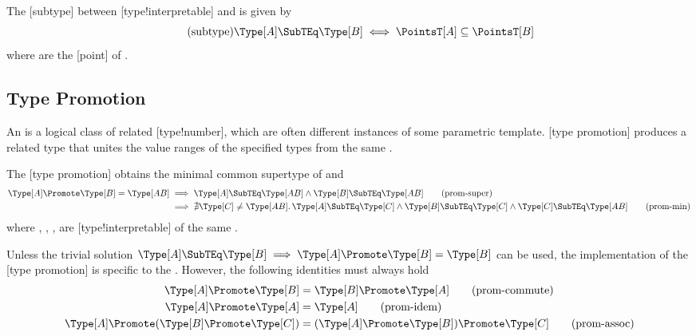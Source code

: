 \begin{definition}
    The [subtype] between [type!interpretable] \Type[A] and \Type[B] is given by
    \begin{equation*}
        \label{eq:subtype}
        \tag{subtype}
        \Type[A] \SubTEq \Type[B] \iff \PointsT[A] \subseteq \PointsT[B]
    \end{equation*}
    where \PointsT{} are the [point] of  \Type[T].
\end{definition}

\subsection{Type Promotion}

An  is a logical class of related [type!number], which are often different instances of some parametric  template.
[type promotion] produces a related type that unites the value ranges of the specified types from the same .

\begin{definition}
    The [type promotion] \Promote{} obtains the minimal common supertype of \Type[A] and \Type[B]
    \begin{align*}
        \Type[A] \Promote \Type[B] = \Type[AB] &\implies \Type[A] \SubTEq \Type[AB] \land \Type[B] \SubTEq \Type[AB] \tag{prom-super}\label{eq:prom_super}\\
        &\implies \nexists \Type[C] \ne \Type[AB]\ldotp\Type[A] \SubTEq \Type[C] \land \Type[B] \SubTEq \Type[C] \land \Type[C]\SubTEq\Type[AB] \tag{prom-min}\label{eq:prom_min}
    \end{align*}
    where \Type[A], \Type[B], \Type[AB], \Type[C] are [type!interpretable] of the same .
\end{definition}

Unless the trivial solution \(\Type[A] \SubTEq \Type[B] \implies \Type[A] \Promote \Type[B] = \Type[B]\) can be used, the implementation of the [type promotion] is specific to the .
However, the following identities must always hold
\begin{align*}
    \Type[A] \Promote \Type[B] &= \Type[B] \Promote \Type[A] \tag{prom-commute}\label{eq:prom_commute}\\
    \Type[A] \Promote \Type[A] &= \Type[A] \tag{prom-idem}\label{eq:prom_idem}\\
    \Type[A] \Promote (\Type[B] \Promote \Type[C]) &= (\Type[A] \Promote \Type[B]) \Promote \Type[C] \tag{prom-assoc}\label{prom:prom_assoc}\\
\end{align*}

